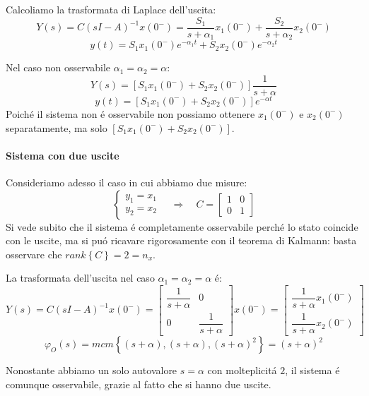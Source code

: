 \documentclass[../main.tex]{subfiles}
\begin{document}
\begin{Exercise}[title={Studiare l'osservabilit\'a di due vasche in parallelo}]
				Calcoliamo la trasformata di Laplace dell'uscita:
				\[
					Y(s) = C(sI-A)^{-1} x(0^{-}) = \dfrac{S_1}{s+\alpha_1}x_1(0^{-}) + \dfrac{S_2}{s+\alpha_2}x_2(0^{-})
				\]
				\[
					y(t) = S_1x_1(0^{-}) e^{-\alpha_1 t} + S_2x_2(0^{-}) e^{-\alpha_2 t}
				\]
				
				Nel caso non osservabile $ \alpha_1 = \alpha_2 = \alpha $:
				\[
					Y(s) = [S_1 x_1(0^{-}) + S_2 x_2(0^{-})] \dfrac{1}{s+\alpha}
				\]
				\[
					y(t) = [S_1 x_1(0^{-}) + S_2 x_2(0^{-})] e^{-\alpha t}
				\]
				Poich\'e il sistema non \'e osservabile non possiamo ottenere $ x_1(0^{-}) $ e $ x_2(0^{-}) $ separatamente, ma solo $ \left[ S_1 x_1(0^{-}) + S_2 x_2(0^{-}) \right] $.
			
			\paragraph{Sistema con due uscite}
				Consideriamo adesso il caso in cui abbiamo due misure:
				\[
					\begin{cases}
						y_1 = x_1\\
						y_2 = x_2
					\end{cases}
					\quad\Rightarrow\quad
					C =
					\begin{bmatrix}
						1 & 0\\
						0 & 1
					\end{bmatrix}
				\]
				Si vede subito che il sistema \'e completamente osservabile perch\'e lo stato coincide con le uscite, ma si pu\'o ricavare rigorosamente con il teorema di Kalmann: basta osservare che $ rank\left\lbrace C \right\rbrace = 2 = n_x $.
				
				La trasformata dell'uscita nel caso $ \alpha_1 = \alpha_2 = \alpha $ \'e:
				\[
					Y(s) = C(sI-A)^{-1} x(0^{-}) =
					\begin{bmatrix}
						\dfrac{1}{s+\alpha} & 0\\
						0 & \dfrac{1}{s+\alpha}
					\end{bmatrix} x(0^{-}) =
					\begin{bmatrix}
						\dfrac{1}{s+\alpha} x_1(0^{-})\\
						\dfrac{1}{s+\alpha} x_2(0^{-})
					\end{bmatrix}
				\]
				\[
					\varphi_O(s) = mcm\left\lbrace (s+\alpha), (s+\alpha), (s+\alpha)^2 \right\rbrace = (s+\alpha)^2
				\]
				
				Nonostante abbiamo un solo autovalore $ s = \alpha $ con molteplicit\'a $ 2 $, il sistema \'e comunque osservabile, grazie al fatto che si hanno due uscite.
		\end{Exercise}
\end{document}
